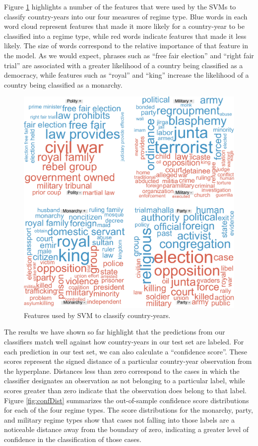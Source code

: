 \documentclass[pdftex,12pt,fullpage,oneside]{amsart}
\begin{document}
Figure \ref{fig:wrdCloud} highlights a number of the features that were used by the SVMs to classify country-years into our four measures of regime type. Blue words in each word cloud represent features that made it more likely for a country-year to be classified into a regime type, while red words indicate features that made it less likely. The size of words correspond to the relative importance of that feature in the model. As we would expect, phrases such as ``free fair election'' and ``right fair trial'' are associated with a greater likelihood of a country being classified as a democracy, while features such as ``royal'' and ``king'' increase the likelihood of a country being classified as a monarchy. 

\begin{figure}[ht]
	\centering
	\includegraphics[width=.7\textwidth]{pol_bin_wrdCloud}
	\caption{Features used by SVM to classify country-years.}
	\label{fig:wrdCloud}
\end{figure}
\FloatBarrier

The results we have shown so far highlight that the predictions from our classifiers match well against how country-years in our test set are labeled. For each prediction in our test set, we can also calculate a ``confidence score''. These scores represent the signed distance of a particular country-year observation from the hyperplane. Distances less than zero correspond to the cases in which the classifier designates an observation as not belonging to a particular label, while scores greater than zero indicate that the observation does belong to that label. Figure \ref{fig:confDist} summarizes the out-of-sample confidence score distributions for each of the four regime types. The score distributions for the monarchy, party, and military regime types show that cases not falling into those labels are a noticeable distance away from the boundary of zero, indicating a greater level of confidence in the classification of those cases.
\end{document}
